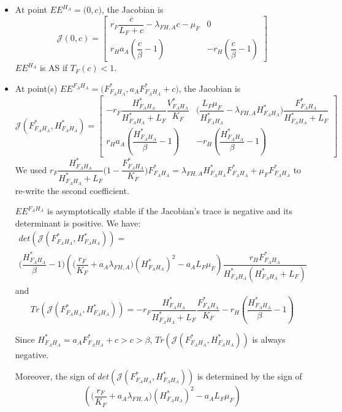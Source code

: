 \documentclass{article}
\newcommand{\lfa}{\lambda_{FH, A}}
\begin{document}
\begin{itemize}
\item At point $EE^{H_A} = \Big(0,c \Big)$, the Jacobian is
\begin{equation}
\mathcal{J}(0,c) = \begin{bmatrix}
r_F \dfrac{c}{L_F +c} - \lfa c - \mu_F & 0 \\
r_H a_A (\dfrac{c}{\beta} - 1) & -r_H(\dfrac{c}{\beta} - 1)
\end{bmatrix}
\end{equation}
$EE^{H_A}$ is AS if $T_F(c) < 1$.

\item At point(s) $EE^{F_AH_A} = \Big(F^*_{F_AH_A}, a_A F^*_{F_AH_A} + c)$, the Jacobian is
\begin{equation}
\mathcal{J}(F^*_{F_AH_A}, H^*_{F_AH_A}) = \begin{bmatrix}
-r_F\dfrac{H^*_{F_AH_A}}{H^*_{F_AH_A} + L_F} \dfrac{V^*_{F_AH_A}}{K_F} & \Big(\dfrac{L_F\mu_F}{H^*_{F_AH_A}} - \lfa H^*_{F_AH_A}) \dfrac{F^*_{F_AH_A}}{H^*_{F_AH_A} + L_F} \\
r_H a_A (\dfrac{H^*_{F_AH_A}}{\beta} - 1) & -r_H(\dfrac{H^*_{F_AH_A}}{\beta} - 1)
\end{bmatrix}
\label{stabilityFAHA:jacobianFAHA}
\end{equation}
We used $r_F \dfrac{H^*_{F_AH_A}}{H^*_{F_AH_A} + L_F} \Big(1 - \dfrac{F^*_{F_AH_A}}{K_F} \Big)F^*_{F_AH_A} = \lfa H^*_{F_AH_A} F^*_{F_AH_A} + \mu_FF^*_{F_AH_A}$ to re-write the second coefficient.

$EE^{F_AH_A}$ is asymptotically stable if the Jacobian's trace is negative and its determinant is positive. We have:
\begin{multline}
det(\mathcal{J}(F^*_{F_AH_A}, H^*_{F_AH_A})) = \\ \Big(\dfrac{H^*_{F_AH_A}}{\beta} - 1\Big) \left( \Big(\dfrac{r_F}{K_F} + a_A \lfa \Big) (H^*_{F_AH_A})^2 - a_A L_F \mu_F \right) \dfrac{r_H F^*_{F_AH_A}}{H^*_{F_AH_A}(H^*_{F_AH_A} + L_F)}
\end{multline}
and
\begin{equation}
Tr(\mathcal{J}(F^*_{F_AH_A}, H^*_{F_AH_A})) = -r_F  \dfrac{H^*_{F_AH_A}}{H^*_{F_AH_A}+L_F}\dfrac{F^*_{F_AH_A}}{K_F} - r_H(\dfrac{H^*_{F_AH_A}}{\beta} - 1)
\end{equation}

Since $H^*_{F_AH_A} = a_A F^*_{F_AH_A} + c > c > \beta$, $Tr(\mathcal{J}(F^*_{F_AH_A}, H^*_{F_AH_A}))$ is always negative.

Moreover, the sign of $det(\mathcal{J}(F^*_{F_AH_A}, H^*_{F_AH_A}))$ is determined by the sign of $$\left( \Big(\dfrac{r_F}{K_F} + a_A\lfa\Big) (H^*_{F_AH_A})^2 - a_A L_F \mu_F \right)$$
\\


\end{itemize}
\end{document}
